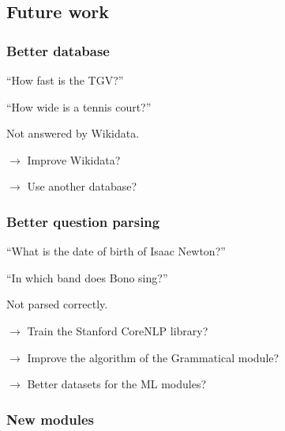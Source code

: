 \subsection{Future work}

\begin{frame}
    \frametitle{Better database}

    ``How fast is the TGV?''

    ``How wide is a tennis court?''

    Not answered by \alert{Wikidata}.

    \medbreak

    $\rightarrow$ Improve Wikidata?

    $\rightarrow$ Use another database?
\end{frame}

\begin{frame}
    \frametitle{Better question parsing}

    ``What is the date of birth of Isaac Newton?''

    ``In which band does Bono sing?''

    Not parsed correctly.

    \medbreak

    $\rightarrow$ Train the Stanford CoreNLP library?

    $\rightarrow$ Improve the algorithm of the Grammatical module?

    $\rightarrow$ Better datasets for the ML modules?
\end{frame}

\begin{frame}
    \frametitle{New modules}
\begin{figure}
\end{figure}
\end{frame}

